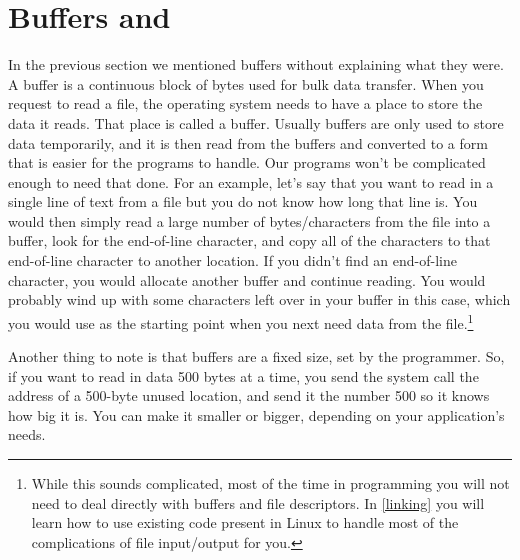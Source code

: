 \section{Buffers and }
\label{buffersbss}

In the previous section we mentioned buffers without explaining what they
were.  A buffer is a continuous block of bytes used for bulk data transfer.
When you request to read a file, the operating system needs to have a place
to store the data it reads.  That place is called a buffer.   Usually buffers
are only used to store data temporarily, and it is then read from the buffers
and converted to a form that is easier for the programs to handle.  Our
programs won't be complicated enough to need that done.
For an example, let's say that you want to read in a single line of text from
a file but you do not know how long that line is.  You would then
simply read a large number of bytes/characters from the file into a buffer, 
look for the end-of-line character, and copy all of the characters to that
end-of-line character to another location.  If you didn't find an end-of-line
character, you would allocate another buffer and continue reading.
You would probably wind up with some characters left over in your buffer
in this case, which you would use as the starting point when you next need
data from the file.\footnote{While this sounds complicated, most of 
the time in programming you will not need to deal directly with buffers
and file descriptors.  In \autoref{linking} you will learn how
to use existing code present in Linux to handle most of the complications
of file input/output for you.}

Another thing to note is that buffers are a fixed size, set by the programmer.
So, if you want to read in data 500 bytes at a time, you send the 
 system call the address of a 500-byte unused location,
and send it the number 500 so it knows how big it is.  You can make it smaller
or bigger, depending on your application's needs.  

